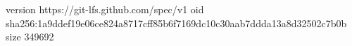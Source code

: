 version https://git-lfs.github.com/spec/v1
oid sha256:1a9ddef19e06ce824a8717cff85b6f7169dc10c30aab7ddda13a8d32502c7b0b
size 349692
